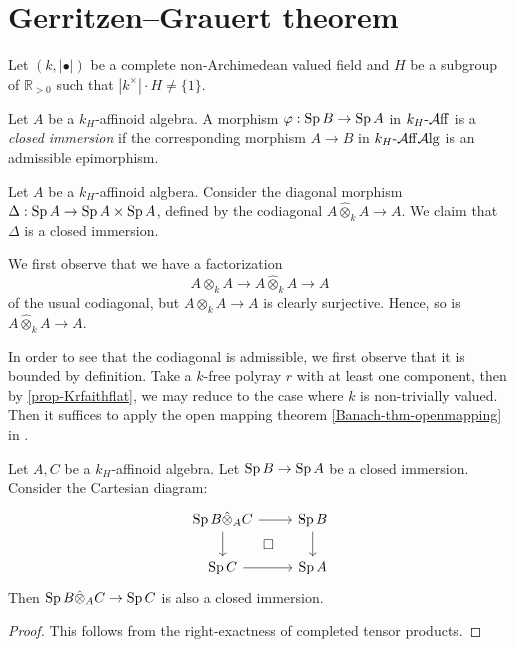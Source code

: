 \section{Gerritzen--Grauert theorem}
Let $(k,|\bullet|)$ be a complete non-Archimedean valued field and $H$ be a subgroup of $\mathbb{R}_{>0}$ such that $|k^{\times}|\cdot H\neq \{1\}$.

\begin{definition}\label{def-closedimmersion}
    Let $A$ be a $k_H$-affinoid algebra. A morphism $\varphi:\operatorname{Sp} B\rightarrow \operatorname{Sp} A$ in $k_H\text{-}\mathcal{A}\mathrm{ff}$ is a \emph{closed immersion} if the corresponding morphism $A\rightarrow B$ in $k_H\text{-}\mathcal{A}\mathrm{ff}\mathcal{A}\mathrm{lg}$ is an admissible epimorphism.
\end{definition}

\begin{example}\label{ex-diagonalclosedimm}
    Let $A$ be a $k_H$-affinoid algbera. Consider the diagonal morphism $\Delta:\operatorname{Sp} A\rightarrow  \operatorname{Sp} A \times \operatorname{Sp} A$, defined by the codiagonal $A\hat{\otimes}_k A\rightarrow A$. We claim that $\Delta$ is a closed immersion.

    We first observe that we have a factorization
    \[
        A\otimes_k A\rightarrow A\hat{\otimes}_k  A\rightarrow A
    \]
    of the usual codiagonal, but $A\otimes_k A\rightarrow A$ is clearly surjective. Hence, so is $A\hat{\otimes}_k  A\rightarrow A$.

    In order to see that the codiagonal is admissible, we first observe that it is bounded by definition. Take a $k$-free polyray $r$ with at least one component, then by \cref{prop-Krfaithflat}, we may reduce to the case where $k$ is non-trivially valued. Then it suffices to apply the open mapping theorem \cref{Banach-thm-openmapping} in .
\end{example}

\begin{proposition}\label{prop-closedimmbasechange}
    Let $A,C$ be a $k_H$-affinoid algebra. Let $\operatorname{Sp} B\rightarrow \operatorname{Sp} A$ be a closed immersion. Consider the Cartesian diagram:
    \[
        \begin{tikzcd}
            \Sp B\hat{\otimes}_A C \arrow[r] \arrow[d] \arrow[rd, "\square", phantom] & \Sp B \arrow[d] \\
            \Sp C \arrow[r]                                                           & \Sp A          
        \end{tikzcd}  
    \]
    Then $\operatorname{Sp} B\hat{\otimes}_A C\rightarrow \operatorname{Sp} C$ is also a closed immersion.
\end{proposition}
\begin{proof}
    This follows from the right-exactness of completed tensor products.
\end{proof}


